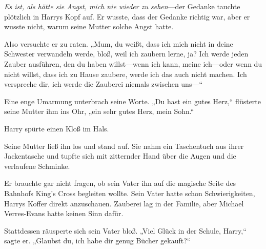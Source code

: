 \emph{Es ist, als hätte sie Angst, mich nie wieder zu sehen}—der Gedanke tauchte plötzlich in Harrys Kopf auf. Er wusste, dass der Gedanke richtig war, aber er wusste nicht, warum seine Mutter solche Angst hatte.

Also versuchte er zu raten. „Mum, du weißt, dass ich mich nicht in deine Schwester verwandeln werde, bloß, weil ich zaubern lerne, ja? Ich werde jeden Zauber ausführen, den du haben willst—wenn ich kann, meine ich—oder wenn du nicht willst, dass ich zu Hause zaubere, werde ich das auch nicht machen. Ich verspreche dir, ich werde die Zauberei niemals zwischen uns—“

Eine enge Umarmung unterbrach seine Worte. „Du hast ein gutes Herz,“ flüsterte seine Mutter ihm ins Ohr, „ein sehr gutes Herz, mein Sohn.“

Harry spürte einen Kloß im Hals.

Seine Mutter ließ ihn los und stand auf. Sie nahm ein Taschentuch aus ihrer Jackentasche und tupfte sich mit zitternder Hand über die Augen und die verlaufene Schminke.

Er brauchte gar nicht fragen, ob sein Vater ihn auf die magische Seite des Bahnhofs King’s Cross begleiten wollte. Sein Vater hatte schon Schwierigkeiten, Harrys Koffer direkt anzuschauen. Zauberei lag in der Familie, aber Michael Verres-Evans hatte keinen Sinn dafür.

Stattdessen räusperte sich sein Vater bloß. „Viel Glück in der Schule, Harry,“ sagte er. „Glaubst du, ich habe dir genug Bücher gekauft?“

